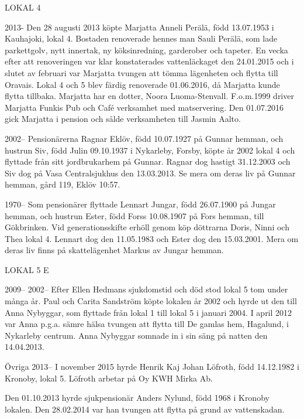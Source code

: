 LOKAL 4

 2013-
Den 28 augusti 2013 köpte Marjatta Anneli Perälä, född 13.07.1953 i Kauhajoki, lokal 4.	 Bostaden renoverade hennes man Sauli Perälä, som lade parkettgolv, nytt innertak, ny köksinredning, garderober och tapeter. En vecka efter att renoveringen var klar konstaterades vattenläckaget den 24.01.2015 och i slutet av februari var Marjatta tvungen att tömma lägenheten och flytta till Oravais. Lokal 4 och 5 blev färdig renoverade 01.06.2016, då Marjatta kunde flytta tillbaka. Marjatta har en dotter, Noora Luoma-Stenvall. F.o.m.1999 driver Marjatta Funkis Pub och Café verksamhet med matservering. Den 01.07.2016 gick Marjatta i pension och sålde verksamheten till Jasmin Aalto.

 2002--
Pensionärerna Ragnar Eklöv, född 10.07.1927 på Gunnar hemman, och hustrun Siv, född Julin 09.10.1937 i Nykarleby, Forsby, köpte år 2002 lokal 4 och flyttade från sitt jordbrukarhem på Gunnar. Ragnar dog hastigt 31.12.2003 och Siv dog på Vasa Centralsjukhus den 13.03.2013. Se mera om deras liv på Gunnar hemman, gård 119, Eklöv 10:57.

 1970--
Som pensionärer flyttade Lennart Jungar, född 26.07.1900 på Jungar hemman, och hustrun Ester, född Forss 10.08.1907 på Fors hemman, till Gökbrinken. Vid generationsskifte erhöll genom köp döttrarna Doris, Ninni och Thea lokal 4. Lennart dog den 11.05.1983 och Ester dog den 15.03.2001. Mera om deras liv finns på skattelägenhet Markus av Jungar hemman.


LOKAL 5 E

 2009--
 2002--
Efter Ellen Hedmans sjukdomstid och död stod lokal 5 tom under många år. Paul och Carita Sandström köpte lokalen år 2002 och hyrde ut den till Anna Nybyggar, som flyttade från lokal 1 till lokal 5 i januari 2004.  I april 2012 var Anna p.g.a. sämre hälsa tvungen att flytta till De gamlas hem, Hagalund, i Nykarleby centrum. Anna Nybyggar somnade in i sin säng på natten den 14.04.2013.


Övriga  2013--
I november 2015 hyrde Henrik Kaj Johan Löfroth, född 14.12.1982 i Kronoby, lokal 5. Löfroth arbetar på Oy KWH Mirka Ab.

Den 01.10.2013 hyrde sjukpensionär Anders Nylund, född 1968 i Kronoby lokalen. Den 28.02.2014 var han tvungen att flytta på grund av vattenskadan.

